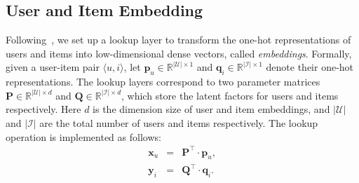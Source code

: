 
\subsection{User and Item Embedding}

Following~\cite{he2017neural}, we set up a lookup layer to transform the one-hot representations of users and items into
 low-dimensional dense vectors, called \emph{embeddings}. Formally, given a user-item pair $\langle u, i \rangle$, let
 $\mathbf{p}_u \in \mathbb{R}^{|\mathcal{U}| \times 1}$ and $\mathbf{q}_i \in \mathbb{R}^{|\mathcal{I}| \times 1}$ denote their one-hot representations.  The lookup layers correspond to two parameter matrices $\mathbf{P} \in \mathbb{R}^{|\mathcal{U}| \times d}$ and $\mathbf{Q} \in \mathbb{R}^{|\mathcal{I}| \times d  }$, which store the latent factors for users and items respectively.  Here $d$ is the dimension size of user and item embeddings, and $|\mathcal{U}|$ and $|\mathcal{I}|$ are the total number of users and items respectively.
 The lookup operation is implemented as follows:
 \begin{eqnarray}
\mathbf{x}_u &=& \mathbf{P}^{\top} \cdot \mathbf{p}_u, \label{equ-userembedding}\\
\mathbf{y}_i &=& \mathbf{Q}^{\top} \cdot \mathbf{q}_i. \label{equ-itemembedding}
\end{eqnarray}

